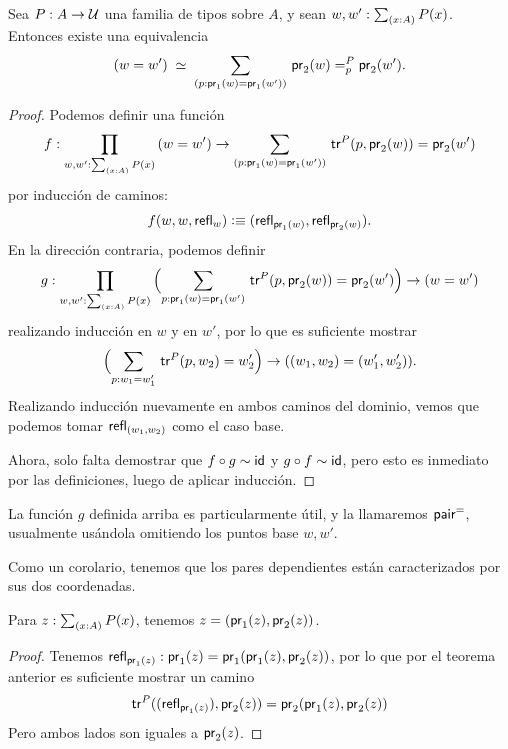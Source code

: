 \documentclass[../main.tex]{subfiles}
\begin{document}
\begin{theorem}
  \label{sigma-char}
  Sea $P:A\to\mathcal{U}$ una familia de tipos sobre $A$, y sean $w,w':\sm{x:A}P(x)$. Entonces existe una equivalencia
  \begin{equation*}
    \eqvspaced{(w=w')}{\dsm{p:\proj{1}(w)=\proj{1}(w')} \snd(w)=^P_p\snd(w')}.
  \end{equation*}
\end{theorem}
\begin{proof}
  Podemos definir una función
  \begin{equation*}
    f : \prd{w,w':\sm{x:A}P(x)} (w=w') \to \dsm{p:\proj{1}(w)=\proj{1}(w')} \trfib{P}{p}{\proj{2}(w)}=\proj{2}(w')
  \end{equation*}
  por inducción de caminos:
  \begin{equation*}
    f(w,w,\mathsf{refl}_{w})\vcentcolon\equiv(\mathsf{refl}_{\mathsf{pr}_{1}(w)},\mathsf{refl}_{\mathsf{pr}_{2}(w)}).
  \end{equation*}
  En la direcci\'on contraria, podemos definir
  \begin{equation*}
    g : \prd{w,w':\sm{x:A}P(x)}
    \Parens{\sm{p:\proj{1}(w)=\proj{1}(w')}\trfib{P}{p}{\proj{2}(w)}=\proj{2}(w')}
    \to
    (w=w')
  \end{equation*}
  realizando inducci\'on en $w$ y en $w'$, por lo que es suficiente mostrar
  \begin{equation*}
    \Parens{\sm{p:w_1 = w_1'}\trfib{P}{p}{w_2}=w_2'} \to ((w_1,w_2)=(w_1',w_2')).
  \end{equation*}
  Realizando inducción nuevamente en ambos caminos del dominio, vemos que podemos tomar $\mathsf{refl}_{(w_1,w_2)}$ como el caso base.

  Ahora, solo falta demostrar que $f \circ g \sim \mathsf{id}$ y $g \circ f \sim \mathsf{id}$, pero esto es inmediato por las definiciones, luego de aplicar inducción.
\end{proof}

La funci\'on $g$ definida arriba es particularmente \'util, y la llamaremos $\mathsf{pair}^=$, usualmente us\'andola omitiendo los puntos base $w,w'$.

Como un corolario, tenemos que los pares dependientes est\'an caracterizados por sus dos coordenadas.

\begin{corollary}
  Para $z:\sm{x:A} P(x)$, tenemos $z = (\mathsf{pr}_{1}(z),\mathsf{pr}_{2}(z))$.
\end{corollary}
\begin{proof}
  Tenemos $\mathsf{refl}_{\mathsf{pr}_{1}(z)} : \mathsf{pr}_{1}(z) = \mathsf{pr}_{1}(\mathsf{pr}_{1}(z),\mathsf{pr}_{2}(z))$, por lo que por el teorema anterior es suficiente mostrar un camino
  \[ \mathsf{tr}^{P}((\mathsf{refl}_{\mathsf{pr}_{1}(z)}),\mathsf{pr}_{2}(z)) = \mathsf{pr}_{2}(\mathsf{pr}_{1}(z),\mathsf{pr}_{2}(z)) \]
  Pero ambos lados son iguales a $\mathsf{pr}_{2}(z)$.
\end{proof}
\end{document}
